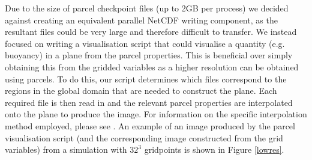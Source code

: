 \documentclass{article}
\begin{document}
Due to the size of parcel checkpoint files (up to 2GB per process) we decided against creating an equivalent parallel NetCDF writing component, as the resultant files could be very large and therefore difficult to transfer. We instead focused on writing a visualisation script that could visualise a quantity (e.g. buoyancy) in a plane from the parcel properties. This is beneficial over simply obtaining this from the gridded variables as a higher resolution can be obtained using parcels. To do this, our script determines which files correspond to the regions in the global domain that are needed to construct the plane. Each required file is then read in and the relevant parcel properties are interpolated onto the plane to produce the image. For information on the specific interpolation method employed, please see \citet{Boeing2018}. An example of an image produced by the parcel visualisation script (and the corresponding image constructed from the grid variables) from a simulation with $32^3$ gridpoints is shown in Figure \ref{lowres}.
\end{document}
